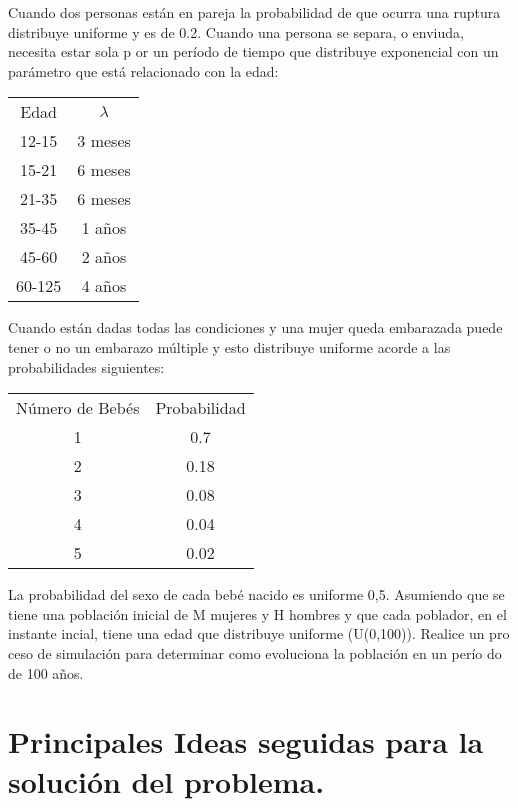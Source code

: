 \documentclass[12pt]{article}
\begin{document}
Cuando dos personas est\'an en pareja la probabilidad de que ocurra una ruptura distribuye uniforme y es de 0.2. Cuando una persona se separa, o enviuda,
necesita estar sola p or un per\'iodo de tiempo que distribuye exponencial con un
par\'ametro que est\'a relacionado con la edad:
\begin{table}[htbp]
	\begin{center}
		\begin{tabular}{c c }
			
			Edad & $\lambda$ \\
			12-15 & 3 meses		\\
			15-21 & 6 meses 	\\
			21-35&  6 meses  \\
			35-45& 1 a\~nos  \\
			45-60 &2 a\~nos  \\
			60-125& 4 a\~nos
		\end{tabular}
	\end{center}
\end{table}

\newpage
Cuando est\'an dadas todas las condiciones y una mujer queda embarazada
puede tener o no un embarazo m\'ultiple y esto distribuye uniforme acorde a las
probabilidades siguientes:
\begin{table}[htbp]
	\begin{center}
		\begin{tabular}{c c }
			
			N\'umero de Beb\'es & Probabilidad \\
			1 & 0.7	\\
			2 & 0.18 	\\
			3&  0.08  \\
			4& 0.04  \\
			5&0.02  \\

		\end{tabular}
	\end{center}
\end{table}

La probabilidad del sexo de cada beb\'e nacido es uniforme 0,5.
Asumiendo que se tiene una poblaci\'on inicial de M mujeres y H hombres y
que cada poblador, en el instante incial, tiene una edad que distribuye uniforme
(U(0,100)). Realice un pro ceso de simulaci\'on para determinar como evoluciona
la poblaci\'on en un per\'io do de 100 a\~nos.

\raggedright
\section{Principales Ideas seguidas para la soluci\'on del problema.}
\end{document}
